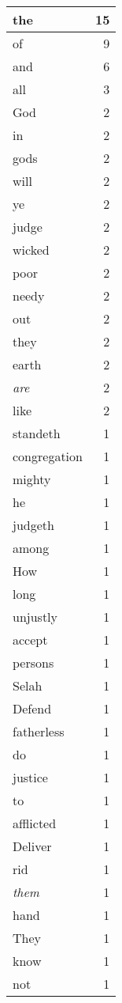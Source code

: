 \begin{center}
\begin{longtable}{l|r}
\hline \hline
\endlastfoot
the & 15 \\ \hline
of & 9 \\ \hline
and & 6 \\ \hline
all & 3 \\ \hline
God & 2 \\ \hline
in & 2 \\ \hline
gods & 2 \\ \hline
will & 2 \\ \hline
ye & 2 \\ \hline
judge & 2 \\ \hline
wicked & 2 \\ \hline
poor & 2 \\ \hline
needy & 2 \\ \hline
out & 2 \\ \hline
they & 2 \\ \hline
earth & 2 \\ \hline
\emph{are} & 2 \\ \hline
like & 2 \\ \hline
standeth & 1 \\ \hline
congregation & 1 \\ \hline
mighty & 1 \\ \hline
he & 1 \\ \hline
judgeth & 1 \\ \hline
among & 1 \\ \hline
How & 1 \\ \hline
long & 1 \\ \hline
unjustly & 1 \\ \hline
accept & 1 \\ \hline
persons & 1 \\ \hline
Selah & 1 \\ \hline
Defend & 1 \\ \hline
fatherless & 1 \\ \hline
do & 1 \\ \hline
justice & 1 \\ \hline
to & 1 \\ \hline
afflicted & 1 \\ \hline
Deliver & 1 \\ \hline
rid & 1 \\ \hline
\emph{them} & 1 \\ \hline
hand & 1 \\ \hline
They & 1 \\ \hline
know & 1 \\ \hline
not & 1 \\ \hline

\end{longtable}
\end{center}
